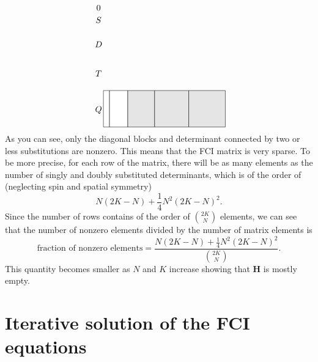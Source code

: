 \documentclass[../Main/chem532-notes.tex]{subfiles}
\begin{document}
\begin{equation}
\begin{tikzpicture}[baseline={([yshift=-.5ex]current bounding box.center)},vertex/.style={anchor=base, minimum size=18pt, inner sep=2pt}]
  \filldraw[fill=white, draw=black] (0,1.5) rectangle (0.25,0);
  \filldraw[fill=white, draw=black] (0.25,1.5) rectangle (1.0,0);
    \filldraw[fill=black!10!white, draw=black] (1.0,1.5) rectangle (2.1,0);
	\filldraw[fill=black!10!white, draw=black] (2.1,1.5) rectangle (3.5,0);
	\filldraw[fill=black!10!white, draw=black] (3.5,1.5) rectangle (5,0);

  \node[] at (-0.2,4.9) {0};
  \node[] at (-0.2,4.4) {$S$};
  \node[] at (-0.2,3.4) {$D$};
  \node[] at (-0.2,2.2) {$T$};  
  \node[] at (-0.2,0.7) {$Q$};    
  \end{tikzpicture}
\end{equation}
As you can see, only the diagonal blocks and determinant connected by two or less substitutions are nonzero.
This means that the FCI matrix is very sparse.
To be more precise, for each row of the matrix, there will be as many elements as the number of singly and doubly substituted determinants, which is of the order of (neglecting spin and spatial symmetry)
\begin{equation}
N (2K - N) + \frac{1}{4} N^2 (2K - N)^2.
\end{equation}
Since the number of rows contains of the order of $\binom{2K}{N}$ elements, we can see that the number of nonzero elements divided by the number of matrix elements is
\begin{equation}
\text{fraction of nonzero elements} = \frac{N (2K - N) + \frac{1}{4} N^2 (2K - N)^2}{\binom{2K}{N}}.
\end{equation}
This quantity becomes smaller as $N$ and $K$ increase showing that $\textbf{H}$ is mostly empty.

\section{Iterative solution of the FCI equations}
\end{document}
